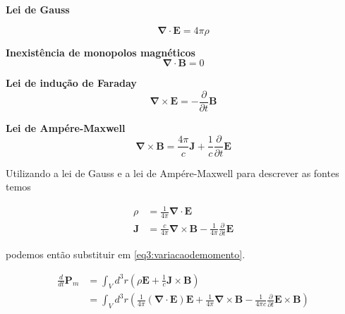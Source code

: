 \begin{tcolorbox}[title=Equações de Maxwell, colframe=blue, colback=blue!5!white, coltitle=white, fonttitle=\bfseries]
	
	\textbf{Lei de Gauss}
	
	\begin{equation}
		\mathbf{\nabla} \cdot \textbf{E}  = 4 \pi \rho
		\label{eq3:leidegauss}
	\end{equation}
	
	\textbf{Inexistência de monopolos magnéticos}
	\begin{equation}
		\mathbf{\nabla} \cdot \textbf{B} = 0
		\label{eq3:monopolos}
	\end{equation}
	
	\textbf{Lei de indução de Faraday}
	\begin{equation}
		\mathbf{\nabla} \times \textbf{E} = - \frac{\partial}{\partial t} \textbf{B}
		\label{eq3:leidefaraday}
	\end{equation}
	
	\textbf{Lei de Ampére-Maxwell}
	\begin{equation}
		\mathbf{\nabla} \times \textbf{B} = \frac{4\pi}{c} \textbf{J} +  \frac{1}{c}\frac{\partial}{\partial t}\textbf{E}
		\label{leideampere}
	\end{equation}
	
\end{tcolorbox}


Utilizando a lei de Gauss e a lei de Ampére-Maxwell para descrever as fontes temos

\begin{equation}
	\begin{split}
		\rho & = \frac{1}{4\pi}\mathbf{\nabla} \cdot \textbf{E} \\
		\textbf{J} & = \frac{c}{4\pi} \mathbf{\nabla} \times \textbf{B} - \frac{1}{4\pi}\frac{\partial}{\partial t}\textbf{E}
	\end{split}
\end{equation}

podemos então substituir em \ref{eq3:variacaodemomento}.

\begin{equation}
	\begin{split}
		\frac{d}{dt} \textbf{P}_m & = \int_V d^3 r \left( \rho \textbf{E} + \frac{1}{c} \textbf{J} \times \textbf{B} \right) \\
		& = \int_V d^3 r \left( \frac{1}{4\pi}\left( \mathbf{\nabla} \cdot \textbf{E}\right)  \textbf{E} + \frac{1}{4\pi} \mathbf{\nabla} \times \textbf{B} - \frac{1}{4\pi c}\frac{\partial}{\partial t}\textbf{E} \times \textbf{B} \right)
	\end{split}
	\label{eq3:semfontes}
\end{equation}


